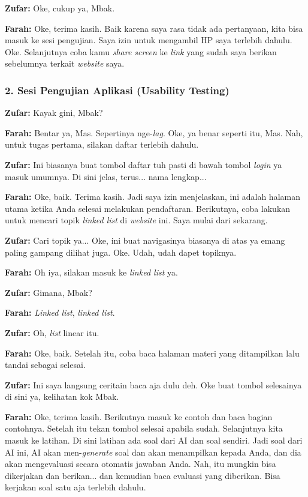 \textbf{Zufar:} Oke, cukup ya, Mbak.

\textbf{Farah:} Oke, terima kasih. Baik karena saya rasa tidak ada pertanyaan, kita bisa masuk ke sesi pengujian. Saya izin untuk mengambil HP saya terlebih dahulu. Oke. Selanjutnya coba kamu \textit{share screen} ke \textit{link} yang sudah saya berikan sebelumnya terkait \textit{website} saya.

\bigskip

\subsubsection*{2. Sesi Pengujian Aplikasi (Usability Testing)}

\textbf{Zufar:} Kayak gini, Mbak?

\textbf{Farah:} Bentar ya, Mas. Sepertinya nge-\textit{lag}. Oke, ya benar seperti itu, Mas. Nah, untuk tugas pertama, silakan daftar terlebih dahulu.

\textbf{Zufar:} Ini biasanya buat tombol daftar tuh pasti di bawah tombol \textit{login} ya masuk umumnya. Di sini jelas, terus... nama lengkap...

\textbf{Farah:} Oke, baik. Terima kasih. Jadi saya izin menjelaskan, ini adalah halaman utama ketika Anda selesai melakukan pendaftaran. Berikutnya, coba lakukan untuk mencari topik \textit{linked list} di \textit{website} ini. Saya mulai dari sekarang.

\textbf{Zufar:} Cari topik ya... Oke, ini buat navigasinya biasanya di atas ya emang paling gampang dilihat juga. Oke. Udah, udah dapet topiknya.

\textbf{Farah:} Oh iya, silakan masuk ke \textit{linked list} ya.

\textbf{Zufar:} Gimana, Mbak?

\textbf{Farah:} \textit{Linked list}, \textit{linked list}.

\textbf{Zufar:} Oh, \textit{list} linear itu.

\textbf{Farah:} Oke, baik. Setelah itu, coba baca halaman materi yang ditampilkan lalu tandai sebagai selesai.

\textbf{Zufar:} Ini saya langsung ceritain baca aja dulu deh. Oke buat tombol selesainya di sini ya, kelihatan kok Mbak.

\textbf{Farah:} Oke, terima kasih. Berikutnya masuk ke contoh dan baca bagian contohnya. Setelah itu tekan tombol selesai apabila sudah. Selanjutnya kita masuk ke latihan. Di sini latihan ada soal dari AI dan soal sendiri. Jadi soal dari AI ini, AI akan men-\textit{generate} soal dan akan menampilkan kepada Anda, dan dia akan mengevaluasi secara otomatis jawaban Anda. Nah, itu mungkin bisa dikerjakan dan berikan... dan kemudian baca evaluasi yang diberikan. Bisa kerjakan soal satu aja terlebih dahulu.

